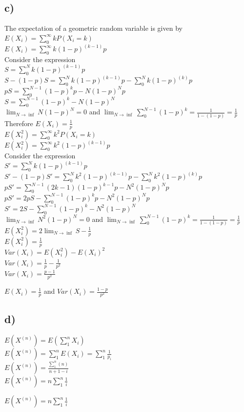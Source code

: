 \documentclass{article}
\begin{document}
\subsection* {c)}
The expectation of a geometric random variable is given by\\
$E(X_i) = \sum_0^\infty kP(X_i = k) $\\
$E(X_i) = \sum_0^\infty k{(1-p)}^{(k-1)}p$\\
Consider the expression\\
$S = \sum_0^N k{(1-p)}^{(k-1)}p$\\
$S -(1-p)S = \sum_0^N k{(1-p)}^{(k-1)}p - \sum_0^N k{(1-p)}^{(k)}p$\\
$pS = \sum_0^{N-1} (1-p)^k p - N(1-p)^Np$\\
$S = \sum_0^{N-1} (1-p)^k -N(1-p)^N$\\
$\lim_{N \to \inf} N(1-p)^N = 0 $ and $\lim_{N\to\inf}\sum_0^{N-1}(1-p)^k = \frac{1}{1-(1-p)} = \frac{1}{p} $\\
Therefore $E(X_i) = \frac{1}{p} $\\
$E(X_i^2) = \sum_0^\infty k^2P(X_i = k) $\\
$E(X_i^2) = \sum_0^\infty k^2{(1-p)}^{(k-1)}p$\\
Consider the expression\\
$S' = \sum_0^N k{(1-p)}^{(k-1)}p$\\
$S' -(1-p)S' = \sum_0^N k^2{(1-p)}^{(k-1)}p - \sum_0^N k^2{(1-p)}^{(k)}p$\\
$pS' = \sum_0^{N-1} (2k-1)(1-p)^{k-1} p - N^2(1-p)^Np$\\
$pS' = 2pS - \sum_0^{N-1}(1-p)^kp - N^2(1-p)^Np$\\
$S' = 2S - \sum_0^{N-1}(1-p)^k -N^2(1-p)^N $\\
$\lim_{N \to \inf} N^2(1-p)^N = 0 $ and $\lim_{N\to\inf}\sum_0^{N-1}(1-p)^k = \frac{1}{1-(1-p)} = \frac{1}{p} $\\
$E(X_i^2) = 2\lim_{N \to \inf}S -\frac{1}{p} $\\
$E(X_i^2) = \frac{1}{p}$\\
$Var(X_i) = E(X_i^2) - E(X_i)^2$\\
$Var(X_i) = \frac{1}{p}-\frac{1}{p^2}$\\
$Var(X_i) = \frac{p-1}{p^2}$\par 
$E(X_i) = \frac{1}{p} $ and $Var(X_i) = \frac{1-p}{p^2}$
\subsection*{d)}
$E(X^{(n)}) = E(\sum_1^n X_i)$\\
$E(X^{(n)}) = \sum_1^n E(X_i) = \sum_1^n\frac{1}{p_i} $\\ 
$E(X^{(n)}) = \frac{\sum_1^n (n)}{n+1-i}$\\
$E(X^{(n)}) = n \sum_1^n\frac{1}{i}$\par 
$E(X^{(n)}) = n \sum_1^n\frac{1}{i}$
\end{document}
